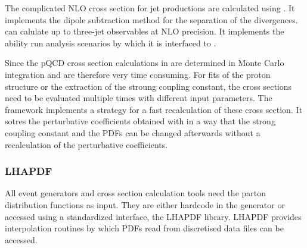 The complicated NLO cross section for jet productions are calculated using
\NLOJETPP. It implements the dipole subtraction method for the separation of the
divergences. \NLOJETPP can calulate up to three-jet observables at NLO precision.
It implements the ability run analysis scenarios by which it is interfaced to
\fastNLO.

Since the pQCD cross section calculations in \NLOJETPP are determined in Monte
Carlo integration and are therefore very time consuming. For fits of the proton
structure or the extraction of the stroung coupling constant, the cross sections
need to be evaluated multiple times with different input parameters. The
\fastNLO framework implements a strategy for a fast recalculation of these cross
section. It sotres the perturbative coefficients obtained with \NLOJETPP in a
way that the strong coupling constant and the PDFs can be changed afterwards
without a recalculation of the perturbative coefficients.

\subsubsection{LHAPDF}

All event generators and cross section calculation tools need the parton
distribution functions as input. They are either hardcode in the generator or
accessed using a standardized interface, the LHAPDF library. LHAPDF provides
interpolation routines by which PDFs read from discretised data files can be
accessed. 
